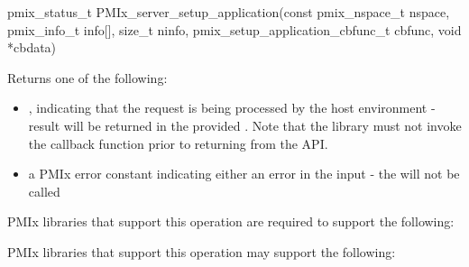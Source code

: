 \format

\cspecificstart
\begin{codepar}
pmix_status_t
PMIx_server_setup_application(const pmix_nspace_t nspace,
                        pmix_info_t info[], size_t ninfo,
                        pmix_setup_application_cbfunc_t cbfunc,
                        void *cbdata)
\end{codepar}
\cspecificend

\begin{arglist}
\end{arglist}

Returns one of the following:

\begin{itemize}
    \item {}, indicating that the request is being processed by the host environment - result will be returned in the provided . Note that the library must not invoke the callback function prior to returning from the \ac{API}.
    \item a PMIx error constant indicating either an error in the input - the  will not be called
\end{itemize}


\reqattrstart
\ac{PMIx} libraries that support this operation are required to support the following:


\reqattrend

\optattrstart
\ac{PMIx} libraries that support this operation may support the following:


